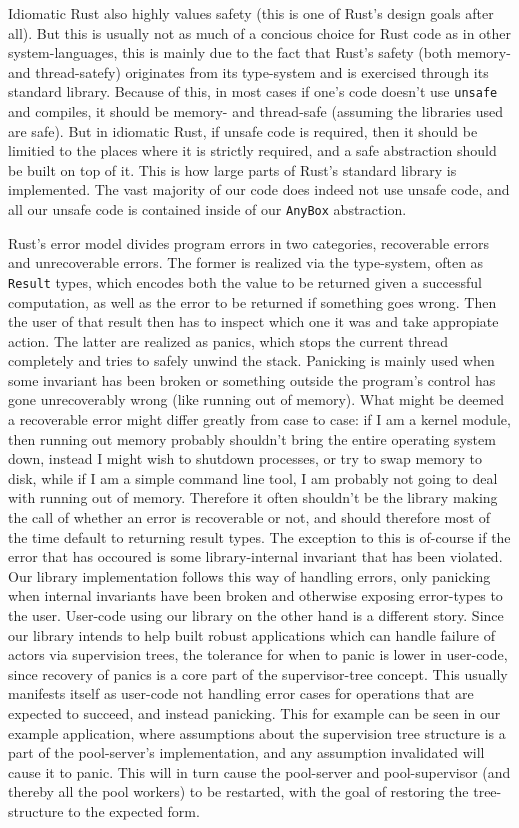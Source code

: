 \documentclass[a4paper]{article}
\begin{document}
Idiomatic Rust also highly values safety (this is one of Rust's design goals after
all). But this is usually not as much of a concious choice for Rust code as in
other system-languages, this is mainly due to the fact that Rust's safety
(both memory- and thread-satefy) originates from its type-system and is exercised
through its standard library. Because of this, in most cases if one's code
doesn't use \texttt{unsafe} and compiles, it should be memory- and thread-safe
(assuming the libraries used are safe). But in idiomatic Rust, if unsafe code is
required, then it should be limitied to the places where it is strictly
required, and a safe abstraction should be built on top of it. This is how large
parts of Rust's standard library is implemented. The vast majority of our code
does indeed not use unsafe code, and all our unsafe code is contained inside of
our \texttt{AnyBox} abstraction.

Rust's error model divides program errors in two categories, recoverable errors
and unrecoverable errors. The former is realized via the type-system, often as
\texttt{Result} types, which encodes both the value to be returned given a
successful computation, as well as the error to be returned if something goes
wrong. Then the user of that result then has to inspect which one it was and
take appropiate action. The latter are realized as panics, which stops the
current thread completely and tries to safely unwind the stack. Panicking is
mainly used when some invariant has been broken or something outside the
program's control has gone unrecoverably wrong (like running out of memory).
What might be deemed a recoverable error might differ greatly from case to case:
if I am a kernel module, then running out memory probably shouldn't bring the
entire operating system down, instead I might wish to shutdown processes, or try
to swap memory to disk, while if I am a simple command line tool, I am probably
not going to deal with running out of memory. Therefore it often shouldn't be
the library making the call of whether an error is recoverable or
not, and should therefore most of the time default to returning result types.
The exception to this is of-course if the error that has occoured is some
library-internal invariant that has been violated. Our library implementation
follows this way of handling errors, only panicking when internal invariants
have been broken and otherwise exposing error-types to the user. User-code using
our library on the other hand is a different story. Since our library intends to
help built robust applications which can handle failure of actors via supervision
trees, the tolerance for when to panic is lower in user-code, since recovery of
panics is a core part of the supervisor-tree concept. This usually manifests
itself as user-code not handling error cases for operations that are expected to
succeed, and instead panicking. This for example can be seen in our example
application, where assumptions about the supervision tree structure is a part of
the pool-server's implementation, and any assumption invalidated will cause it
to panic. This will in turn cause the pool-server and pool-supervisor (and
thereby all the pool workers) to be restarted, with the goal of restoring the
tree-structure to the expected form.
\end{document}
